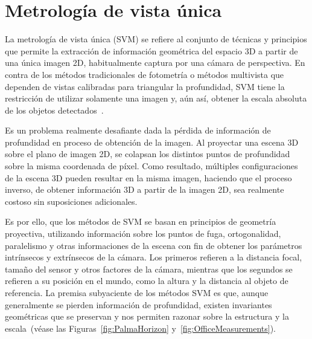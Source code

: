 \section{Metrología de vista única}
La metrología de vista única (SVM) se refiere al conjunto de técnicas y principios que permite la extracción
de información geométrica del espacio 3D a partir de una única imagen 2D, habitualmente captura por una
cámara de perspectiva. En contra de los métodos tradicionales de fotometría o métodos multivista que
dependen de vistas calibradas para triangular la profundidad, SVM tiene la restricción de utilizar solamente
una imagen y, aún así, obtener la escala absoluta de los objetos detectados~\cite{SVMIW}.
\par
Es un problema realmente desafiante dada la pérdida de información de profundidad en proceso de obtención
de la imagen. Al proyectar una escena 3D sobre el plano de imagen 2D, se colapsan los distintos puntos de
profundidad sobre la misma coordenada de píxel. Como resultado, múltiples configuraciones de la escena 3D
pueden resultar en la misma imagen, haciendo que el proceso inverso, de obtener información 3D a partir de
la imagen 2D, sea realmente costoso sin suposiciones adicionales.
\par
Es por ello, que los métodos de SVM se basan en principios de geometría proyectiva, utilizando información
sobre los puntos de fuga, ortogonalidad, paralelismo y otras informaciones de la escena con fin de obtener
los parámetros intrínsecos y extrínsecos de la cámara. Los primeros refieren a la distancia focal, tamaño
del sensor y otros factores de la cámara, mientras que los segundos se refieren a su posición en el mundo,
como la altura y la distancia al objeto de referencia. La premisa subyaciente de los métodos SVM es que,
aunque generalmente se pierden información de profundidad, existen invariantes geométricas que se preservan y
nos permiten razonar sobre la estructura y la escala~\cite{VisionBookMIT,Hartley2004}(véase las Figuras~\ref{fig:PalmaHorizon} y~\ref{fig:OfficeMeasurements}).
\par
